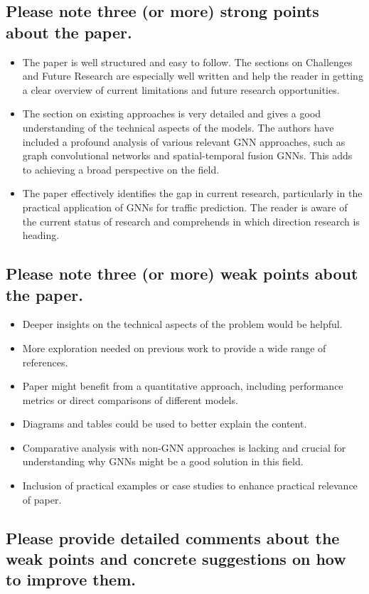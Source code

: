 \documentclass[12pt]{article}
\begin{document}
\subsection*{Please note three (or more) strong points about the paper.}
\begin{itemize}
    \item The paper is well structured and easy to follow. The sections on Challenges and Future Research are especially well written and help the reader in getting a clear overview of current limitations and future research opportunities.
    \item The section on existing approaches is very detailed and gives a good understanding of the technical aspects of the models. The authors have included a profound analysis of various relevant GNN approaches, such as graph convolutional networks and spatial-temporal fusion GNNs. This adds to achieving a broad perspective on the field.
    \item The paper effectively identifies the gap in current research, particularly in the practical application of GNNs for traffic prediction. The reader is aware of the current status of research and comprehends in which direction research is heading. 
\end{itemize}


\subsection*{Please note three (or more) weak points about the paper.}
 \begin{itemize}
    \item Deeper insights on the technical aspects of the problem would be helpful.
    \item More exploration needed on previous work to provide a wide range of references.
    \item Paper might benefit from a quantitative approach, including performance metrics or direct comparisons of different models.
    \item Diagrams and tables could be used to better explain the content.
    \item Comparative analysis with non-GNN approaches is lacking and crucial for understanding why GNNs might be a good solution in this field.
    \item Inclusion of practical examples or case studies to enhance practical relevance of paper.
 \end{itemize}


\subsection*{Please provide detailed comments about the weak points and concrete suggestions on how to improve them.}
\end{document}
